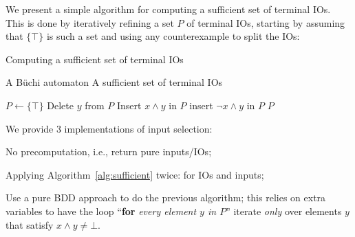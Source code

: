 \documentclass[runningheads,a4paper]{llncs}
\begin{document}
%
%
%
We present a simple algorithm for computing a sufficient set of terminal
IOs.  This is done by iteratively refining a set \(P\) of terminal IOs, starting
by assuming that \(\{\top\}\) is such a set and using any counterexample to split the
IOs:
\begin{algorithm}[H]
\caption{Computing a sufficient set of terminal IOs}
\label{alg:sufficient}
\alginput* A Büchi automaton \cA
\algoutput* A sufficient set of terminal IOs
\begin{algorithmic}
\State \(P \leftarrow \{\top\}\)
      \State Delete \(y\) from \(P\)
      \State Insert \(x \land y\) in \(P\)
        insert \(\neg x \land y\) in \(P\)
      \EndIf
    \EndIf
  \EndFor
\EndFor
\State \Return \(P\)
\end{algorithmic}
\end{algorithm}
\vspace{.5em}

\noindent We provide 3 implementations of input selection:
\begin{compactitem}
\item No precomputation, i.e., return pure inputs/IOs;
\item Applying Algorithm~\ref{alg:sufficient} twice: for IOs and inputs;
\item Use a pure BDD approach to do the previous algorithm; this relies on extra
  variables to have the loop ``\textbf{for}\emph{ every element \(y\) in \(P\)}''
  iterate \emph{only} over elements \(y\) that satisfy \(x \land y \neq \bot\).
\end{compactitem}
\end{document}
